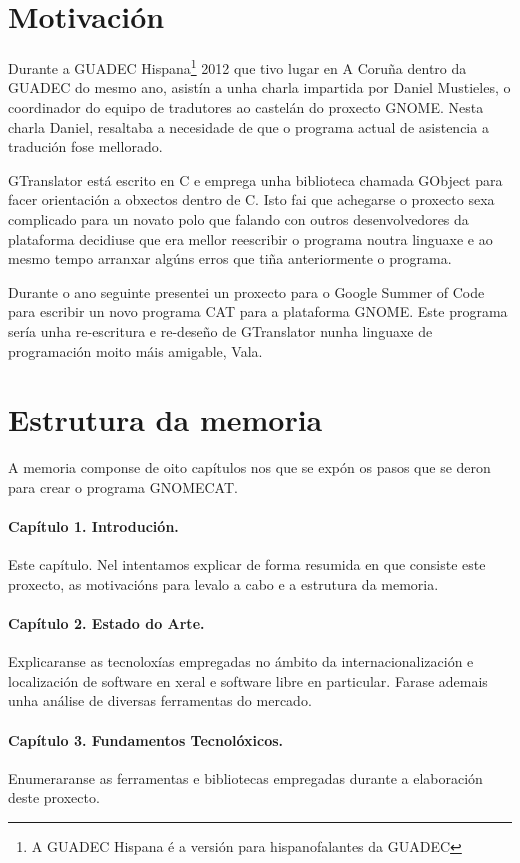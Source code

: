 \section{Motivación}
Durante a GUADEC Hispana\footnote{A GUADEC Hispana é a versión para hispanofalantes da GUADEC} 2012 que tivo lugar en A Coruña dentro da GUADEC do mesmo ano, asistín a unha charla impartida por Daniel Mustieles, o coordinador do equipo de tradutores ao castelán do proxecto GNOME. Nesta charla Daniel, resaltaba a necesidade de que o programa actual de asistencia a tradución fose mellorado.

GTranslator está escrito en C e emprega unha biblioteca chamada GObject para facer orientación a obxectos dentro de C. Isto fai que achegarse o proxecto sexa complicado para un novato polo que falando con outros desenvolvedores da plataforma decidiuse que era mellor reescribir o programa noutra linguaxe e ao mesmo tempo arranxar algúns erros que tiña anteriormente o programa.

Durante o ano seguinte presentei un proxecto para o Google Summer of Code para escribir un novo programa CAT para a plataforma GNOME. Este programa sería unha re-escritura e re-deseño de GTranslator nunha linguaxe de programación moito máis amigable, Vala.

\section{Estrutura da memoria}

A memoria componse de oito capítulos nos que se expón os pasos que se deron para crear o programa GNOMECAT.

\paragraph*{Capítulo 1. Introdución.}
Este capítulo. Nel intentamos explicar de forma resumida en que consiste este proxecto, as motivacións para levalo a cabo e a estrutura da memoria.

\paragraph*{Capítulo 2. Estado do Arte.}
Explicaranse as tecnoloxías empregadas no ámbito da internacionalización e localización de software en xeral e software libre en particular. Farase ademais unha análise de diversas ferramentas do mercado.

\paragraph*{Capítulo 3. Fundamentos Tecnolóxicos.}
Enumeraranse as ferramentas e bibliotecas empregadas durante a elaboración deste proxecto.

